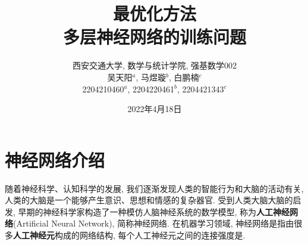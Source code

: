 \documentclass[12pt, a4paper, oneside]{ctexart}
\begin{document}
\newtheorem{example}{例}             %
\newtheorem{theorem}{定理}[section]  %
\newtheorem{definition}{定义}
\newtheorem{axiom}{公理}
\newtheorem{property}{性质}
\newtheorem{proposition}{命题}
\newtheorem{lemma}{引理}
\newtheorem{corollary}{推论}
\newtheorem{remark}{注解}
\newtheorem{condition}{条件}
\newtheorem{conclusion}{结论}
\newtheorem{assumption}{假设}
\newtheorem{algorithm}{算法}

\renewcommand{\contentsname}{目录}  %
\renewcommand{\abstractname}{摘要}  %
\renewcommand{\refname}{参考文献}   %
\renewcommand{\indexname}{索引}
\renewcommand{\figurename}{图}
\renewcommand{\tablename}{表}
\renewcommand{\appendixname}{附录}
\graphicspath{{figure/}}  %

\def\bd{\boldsymbol}
\def\disp{\displaystyle}
\def\sign{\text{sign}}
\def\wtd{\widetilde}
\def\bR{\mathbb{R}}
\def\wdh{\widehat}
\def\L{\mathcal{L}}
\def\add{\vspace{1ex}}  %
\def\del{\vspace{-3.5ex}}  %


\title{最优化方法\\多层神经网络的训练问题}
\author{
西安交通大学, 数学与统计学院, 强基数学002\\[3ex]
吴天阳$^a$, 马煜璇$^b$, 白鹏楠$^c$\\[1ex]
2204210460$^a$, 2204220461$^b$, 2204421343$^c$\\[2ex]
}
\date{2022年4月18日}

\maketitle %
\clearpage
\tableofcontents %

\clearpage

\section{神经网络介绍}
随着神经科学、认知科学的发展, 我们逐渐发现人类的智能行为和大脑的活动有关, 人类的大脑是一个能够产生意识、思想和情感的复杂器官. 受到人类大脑大脑的启发, 早期的神经科学家构造了一种模仿人脑神经系统的数学模型, 称为\textbf{人工神经网络}(Artificial Neural Network), 简称神经网络. 在机器学习领域, 神经网络是指由很多\textbf{人工神经元}构成的网络结构, 每个人工神经元之间的连接强度是. 
\end{document}
